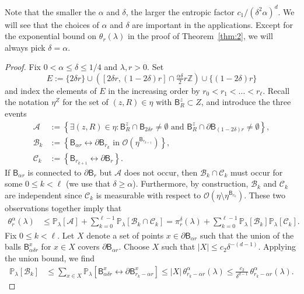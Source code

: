 \documentclass[AHL,Unicode,longabstracts]{cedram}
\begin{document}
Note that the smaller the $\alpha$ and $\delta$, the larger the entropic factor $c_1/(\delta^2\alpha)^d$. We will see that the choices of $\alpha$ and $\delta$ are important in the applications. Except for the exponential bound on $\theta_r(\lambda)$ in the proof of Theorem~\ref{thm:2}, we will always pick $\delta=\alpha$.
\begin{proof}
Fix $0<\alpha\le \delta\le 1/4$ and $\lambda,r>0$. Set
\[
E:=\{2\delta r\}\cup \left([2\delta r,(1-2\delta)r]\cap \tfrac{\alpha\delta}{2} r{\mathbb Z}\right)\cup\{(1-2\delta)r\}
\]
and index the elements of $E$ in the increasing order by $r_0< r_1<\dots< r_\ell$. Recall the notation $\eta^Z$ for the set of $(z,R)\in \eta$ with $\mathsf B_R^z\subset Z$, and introduce the three events
\begin{align*}
{\mathcal A}&:=\left\{\exists (z,R)\in\eta:\mathsf B_R^z\cap\mathsf B_{2\delta r}\ne\emptyset\text{ and }\mathsf B_R^z\cap\partial\mathsf B_{(1-2\delta) r}\ne\emptyset\right\},\\
{\mathcal B}_k&:=\left\{\mathsf B_{\alpha r}\longleftrightarrow\partial\mathsf B_{r_k}\text{ in }{\mathcal O}\left(\eta^{\mathsf B_{r_{k+1}}}\right)\right\},\\
{\mathcal C}_k&:=\left\{\mathsf B_{r_{k+1}}\longleftrightarrow\partial\mathsf B_{r}\right\}.
\end{align*}
If $\mathsf B_{\alpha r}$ is connected to $\partial\mathsf B_r$ but ${\mathcal A}$ does not occur, then ${\mathcal B}_k\cap{\mathcal C}_k$ must occur for some $0\le k<\ell$ (we use that $\delta\ge\alpha$). Furthermore, by construction, ${\mathcal B}_k$ and ${\mathcal C}_k$ are independent since ${\mathcal C}_k$ is measurable with respect to ${\mathcal O}(\eta\setminus\eta^{\mathsf B_{r_{k}}})$. These two observations together imply that
\begin{align}\label{eq:j1}
\theta^\alpha_r (\lambda)&\le {\mathbb P}_\lambda[{\mathcal A}]+\sum_{k=0}^{\ell-1}{\mathbb P}_\lambda[{\mathcal B}_k\cap{\mathcal C}_k]=\pi^\delta_r(\lambda)+\sum_{k=0}^{\ell-1}{\mathbb P}_\lambda[{\mathcal B}_k]{\mathbb P}_\lambda[{\mathcal C}_k].
\end{align}
Fix $0\le k < \ell$. Let $X$ denote a set of points $x\in\partial\mathsf B_{\alpha r}$ such that the union of the balls $\mathsf B_{\alpha \delta r}^x$ for $x\in X$ covers $\partial\mathsf B_{\alpha r}$. Choose $X$ such that $|X|\le c_2 \delta^{-(d-1)}$. Applying the union bound, we find
\begin{align}
{\mathbb P}_\lambda[{\mathcal B}_k]&\le \sum_{x\in X}{\mathbb P}_\lambda\left[\mathsf B_{\alpha \delta r}^x\longleftrightarrow \partial\mathsf B_{r_k-\alpha r}^x\right]\le|X|\,\theta_{r_k-\alpha r}^\alpha(\lambda)\le \frac {c_2}{\delta^{d-1}}\,\theta_{r_k-\alpha r}^\alpha(\lambda).\label{eq:12}

\end{align}
\end{proof}
\end{document}
